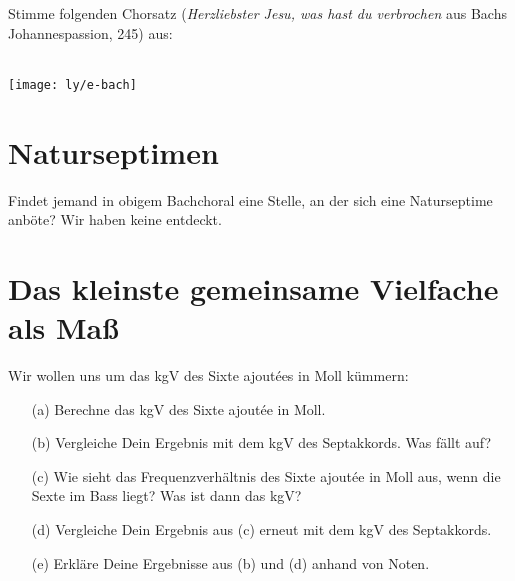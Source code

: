 \documentclass[ngerman,11pt]{scrartcl}
\begin{document}
\begin{aufg}
  Stimme folgenden Chorsatz (\emph{Herzliebster Jesu, was hast du verbrochen}
  aus Bachs Johannespassion,  245) aus:
  \begin{center}
    \\[-\baselineskip]
    \texttt{[image: ly/e-bach]}
  \end{center}%
\end{aufg}

\section{Naturseptimen}

\begin{aufg}
  Findet jemand in obigem Bachchoral eine Stelle, an der sich eine Naturseptime
  anböte? Wir haben keine entdeckt.
\end{aufg}

\appendix

\section{Das kleinste gemeinsame Vielfache als Maß}

\begin{aufg}Wir wollen uns um das kgV des Sixte ajoutées in Moll kümmern:
  \begin{enumerate}
  \item[(a)] Berechne das kgV des Sixte ajoutée in Moll.
  \item[(b)] Vergleiche Dein Ergebnis mit dem kgV des Septakkords. Was fällt auf?
  \item[(c)] Wie sieht das Frequenzverhältnis des Sixte ajoutée in Moll aus,
    wenn die Sexte im Bass liegt? Was ist dann das kgV?
  \item[(d)] Vergleiche Dein Ergebnis aus (c) erneut mit dem kgV des
    Septakkords.
  \item[(e)] Erkläre Deine Ergebnisse aus (b) und (d) anhand von Noten.
  \end{enumerate}
\end{aufg}
\end{document}
